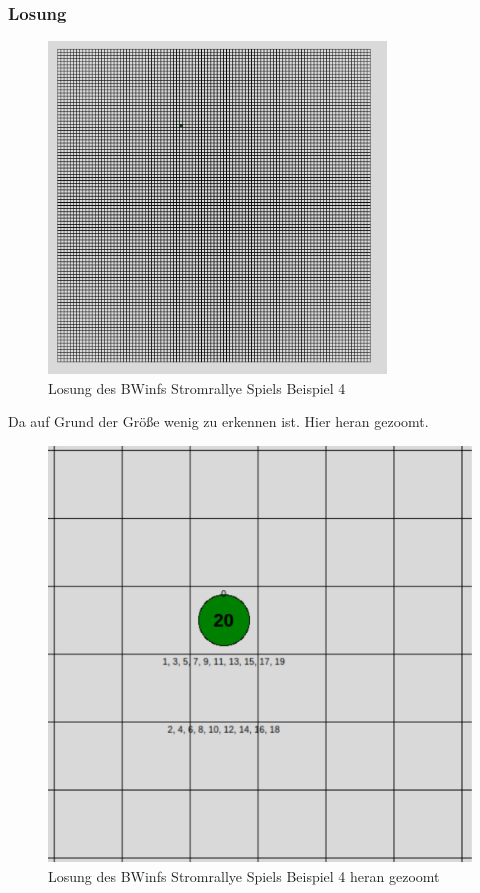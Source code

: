 \documentclass[a4paper,12pt,arial]{scrartcl}
\begin{document}
\subsubsection{Losung}
\begin{figure}[h]
    \centering
    \includegraphics[width=0.8\textwidth]{solution4.png}
    \caption{Losung des BWinfs Stromrallye Spiels Beispiel 4}
    \label{fig:loesung4}
\end{figure}
Da auf Grund der Größe wenig zu erkennen ist.
Hier heran gezoomt.
\begin{figure}[h]
    \centering
    \includegraphics[width=\textwidth]{solution_4_zoomed.pdf}
    \caption{Losung des BWinfs Stromrallye Spiels Beispiel 4 heran gezoomt}
    \label{fig:loesung4_zoomed}
\end{figure}
\end{document}
